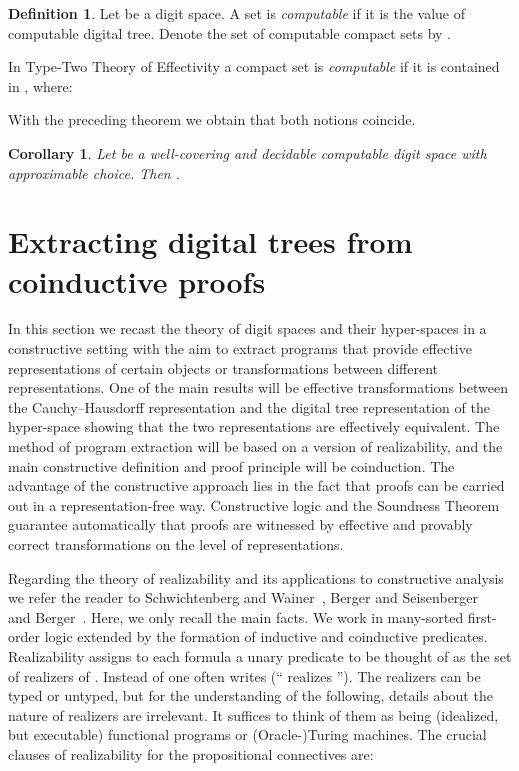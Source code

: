 \documentclass[microtype]{jloganal}
\theoremstyle{plain}
\newtheorem{corollary}[theorem]{Corollary}
\theoremstyle{definition}
\newtheorem{definition}[theorem]{Definition}
\begin{document}
\begin{definition}
\label{def-computable-compact}
Let  be a digit space. A set  is \emph{computable}
if it is the value of computable digital tree. Denote the set of computable compact sets by .
\end{definition}


In Type-Two Theory of Effectivity a compact set is \emph{computable} if it is contained in , where:


With the preceding theorem we obtain that both notions coincide.

\begin{corollary}\label{cor-tte-tree}
Let  be a well-covering and decidable computable digit space with approximable choice. Then .
\end{corollary} 



\section{Extracting digital trees from coinductive proofs}
\label{sec-coind}
In this section we recast the theory of digit spaces and their hyper-spaces
in a constructive setting with the aim to extract programs that provide
effective representations of certain objects or transformations 
between different representations.
One of the main results will be effective transformations between
the Cauchy--Hausdorff representation and the digital tree representation
of the hyper-space showing that the two representations are effectively
equivalent.
The method of program extraction will be based on a version of realizability,
and the main constructive definition and proof principle will be coinduction.
The advantage of the constructive approach lies in the fact that proofs can be
carried out in a representation-free way. Constructive logic and the Soundness
Theorem guarantee automatically that proofs are witnessed by effective and
provably correct transformations on the level of representations.


Regarding the theory of realizability and its applications to constructive
analysis we refer the reader to Schwichtenberg and Wainer~\cite{SchwichtenbergWainer12},
Berger and Seisenberger~\cite{SeisenBerger10} and Berger~\cite{Berger11}. Here, we only recall the main
facts.
We work in many-sorted first-order logic extended by the formation
of inductive and coinductive predicates.
Realizability assigns to each formula  a unary predicate 
to be thought of as the set of realizers of . Instead of 
one often writes  (`` realizes '').
The realizers  can be typed or untyped, but for the understanding of the 
following, details about the nature of realizers are irrelevant.
It suffices to think of them as being (idealized, but executable) functional
programs or (Oracle-)Turing machines.
The crucial clauses of realizability for the propositional connectives are:
\end{document}
